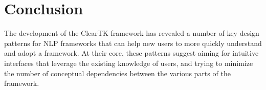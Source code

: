 \documentclass[10pt, a4paper]{article}
\begin{document}
\section{Conclusion}
The development of the ClearTK framework has revealed a number of key design patterns for NLP frameworks that can help new users to more quickly understand and adopt a framework.
At their core, these patterns suggest aiming for intuitive interfaces that leverage the existing knowledge of users, and trying to minimize the number of conceptual dependencies between the various parts of the framework.



\end{document}
